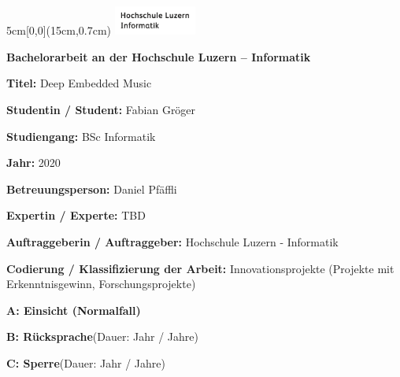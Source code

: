 
\begin{textblock*}{5cm}[0,0](15cm,0.7cm)
	\includegraphics[keepaspectratio,width=2.7cm]{img/HSLU_Logo_Header}
\end{textblock*}

\vspace{0.6cm}
\noindent
\textbf{\Large{Bachelorarbeit an der Hochschule Luzern – Informatik}}

\vspace{0.6cm}
\noindent
\textbf{Titel:} Deep Embedded Music

\vspace{0.6cm}
\noindent
\textbf{Studentin / Student:} Fabian Gröger

\vspace{0.6cm}
\noindent
\textbf{Studiengang:} BSc Informatik

\vspace{0.6cm}
\noindent
\textbf{Jahr:} 2020

\vspace{0.6cm}
\noindent
\textbf{Betreuungsperson:} Daniel Pfäffli

\vspace{0.6cm}
\noindent
\textbf{Expertin / Experte:} TBD

\vspace{0.6cm}
\noindent
\textbf{Auftraggeberin / Auftraggeber:} Hochschule Luzern - Informatik

\vspace*{1.00cm}

\noindent
\textbf{Codierung / Klassifizierung der Arbeit:} Innovationsprojekte (Projekte mit
Erkenntnisgewinn, Forschungsprojekte)

\begin{todolist}
	\item \textbf{A: Einsicht (Normalfall)}
	\item \textbf{B: Rücksprache}\hspace*{0.7cm}(Dauer:\hspace*{1cm} Jahr / Jahre)
	\item \textbf{C: Sperre}\hspace*{1.865cm}(Dauer:\hspace*{1cm} Jahr / Jahre)
\end{todolist}

\vspace*{1.00cm}


